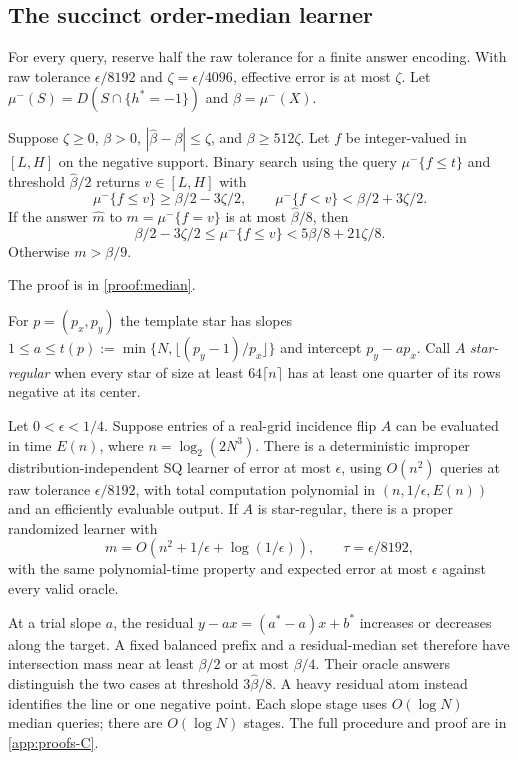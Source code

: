 \subsection{The succinct order-median learner}\label{sec:fast}
For every query, reserve half the raw tolerance for a finite answer encoding. With raw tolerance $\epsilon/8192$ and $\zeta=\epsilon/4096$, effective error is at most $\zeta$. Let $\mu^-(S)=D(S\cap\{h^*=-1\})$ and $\beta=\mu^-(X)$.
\begin{lemma}\label{lem:median}
Suppose $\zeta\ge0$, $\beta>0$, $|\widehat\beta-\beta|\le\zeta$, and $\beta\ge512\zeta$. Let $f$ be integer-valued in $[L,H]$ on the negative support. Binary search using the query $\mu^-\{f\le t\}$ and threshold $\widehat\beta/2$ returns $v\in[L,H]$ with
\[
 \mu^-\{f\le v\}\ge\beta/2-3\zeta/2,
 \qquad
 \mu^-\{f<v\}<\beta/2+3\zeta/2.
\]
If the answer $\widehat m$ to $m=\mu^-\{f=v\}$ is at most $\widehat\beta/8$, then
\begin{equation}\label{eq:balancedmedian}
 \beta/2-3\zeta/2\le\mu^-\{f\le v\}
 <5\beta/8+21\zeta/8.
\end{equation}
Otherwise $m>\beta/9$.
\end{lemma}
\noindent The proof is in \cref{proof:median}.

For $p=(p_x,p_y)$ the template star has slopes $1\le a\le t(p):=\min\{N,\lfloor(p_y-1)/p_x\rfloor\}$ and intercept $p_y-ap_x$. Call $A$ \emph{star-regular} when every star of size at least $64\lceil n\rceil$ has at least one quarter of its rows negative at its center.
\begin{theorem}\label{thm:fast}
Let $0<\epsilon<1/4$. Suppose entries of a real-grid incidence flip $A$ can be evaluated in time $E(n)$, where $n=\log_2(2N^3)$. There is a deterministic improper distribution-independent SQ learner of error at most $\epsilon$, using $O(n^2)$ queries at raw tolerance $\epsilon/8192$, with total computation polynomial in $(n,1/\epsilon,E(n))$ and an efficiently evaluable output. If $A$ is star-regular, there is a proper randomized learner with
\[
 m=O(n^2+1/\epsilon+\log(1/\epsilon)),\qquad
 \tau=\epsilon/8192,
\]
with the same polynomial-time property and expected error at most $\epsilon$ against every valid oracle.
\end{theorem}

At a trial slope $a$, the residual $y-ax=(a^*-a)x+b^*$ increases or decreases along the target. A fixed balanced prefix and a residual-median set therefore have intersection mass near at least $\beta/2$ or at most $\beta/4$. Their oracle answers distinguish the two cases at threshold $3\widehat\beta/8$. A heavy residual atom instead identifies the line or one negative point. Each slope stage uses $O(\log N)$ median queries; there are $O(\log N)$ stages. The full procedure and proof are in \cref{app:proofs-C}.
